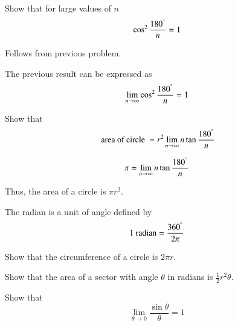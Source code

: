 %
%
\begin{problem}
	Show that for large values of $n$
	\begin{equation}
\cos^2\frac{180^{\degree}}{n} = 1
%
	\end{equation}	
\end{problem}
%
\proof  Follows from previous problem.
%
\begin{definition}
	The previous result can be expressed as
%
\begin{equation}
\lim_{n \rightarrow \infty}\cos^2\frac{180^{\degree}}{n} = 1
\end{equation}
%	
\end{definition}
\begin{problem}
	Show that 
\begin{equation}
\text{ area of circle } = r^2\lim_{n \rightarrow \infty}
{n\tan\frac{180^{\degree}}{n}} 
\end{equation}	
\end{problem}
%
\begin{definition}
	\begin{equation}
	\pi = \lim_{n \rightarrow \infty}
	{n\tan\frac{180^{\degree}}{n}}
	\end{equation}
\end{definition}
Thus, the area of a circle is $\pi r^2$.
\begin{definition}
	The radian is a unit of angle defined by
\begin{equation}
	1 \text{ radian} = \frac{360^{\degree}}{2\pi}
\end{equation}
\end{definition}
%
\begin{problem}
	Show that the circumference of a circle is $2 \pi r$.
\end{problem}
\begin{problem}
	Show that the area of a sector with angle $\theta$ in radians is $\frac{1}{2}r^2\theta$.
\end{problem}
\begin{problem}
	Show that
	\begin{equation}
	\lim_{\theta \rightarrow 0} \frac{\sin\theta}{\theta} = 1
	\end{equation}
\end{problem}
